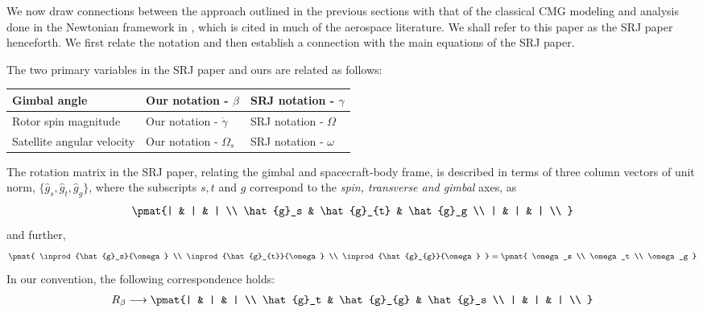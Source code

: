 \documentclass[11pt]{article}                %
\begin{document}
		We now draw connections between the approach outlined in the previous sections
		with that of  the classical CMG modeling and analysis done in the Newtonian 
		framework in \cite{srj}, which is
		cited in much of the aerospace literature. We shall refer to this paper as the SRJ paper
		henceforth. We first relate the notation and then establish a 
		connection with the main equations of the SRJ paper. 
		
		The two primary variables in the SRJ paper and ours are related as follows:
		\begin{center}
		\begin{tabular}{||  l  |  l   |  l   || }
		\hline
		Gimbal angle  & Our notation  - $\beta$  & SRJ notation - $\gamma$ \\
		\hline
		Rotor spin magnitude  & Our notation  - $\dot{\gamma}$  & SRJ notation - $\Omega$ \\
		\hline
		Satellite angular velocity  & Our notation  - $\Omega_s$  & SRJ notation - $\omega$ 
		\\
		\hline
		\end{tabular}
		\end{center}
		The rotation matrix in the SRJ paper, relating the gimbal and spacecraft-body frame, 
		 is described in terms of three column vectors 
		of unit norm, $\{ \hat{g}_s, \hat{g}_{t}, \hat{g}_g \}$, where the subscripts $s, t$ and
		$g$ correspond to the {\it spin, transverse and gimbal} axes,  as
		\begin{align} \pmat{| & | & |  \\  \hat{g}_s & \hat{g}_{t} & \hat{g}_g  \\ | & | & |  \\ }
		\end{align}
		and further,
		\begin{align}
			\pmat{ \inprod{\hat{g}_s}{\omega} \\  \inprod{\hat{g}_{t}}{\omega}  \\ 
			 \inprod{\hat{g}_{g}}{\omega}    } = \pmat{  \omega_s  \\ \omega_t  \\  \omega_g }
		\end{align} 
		In our convention, the following correspondence holds: 
		\begin{align} 
			R_{\beta} \longrightarrow 
			 \pmat{| & | & |  \\  \hat{g}_t & \hat{g}_{g} & \hat{g}_s  \\ | & | & |  \\ }
		\end{align}
\end{document}
